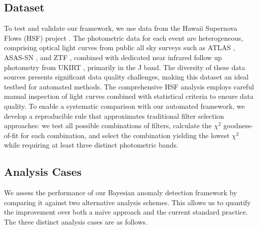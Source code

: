 \subsection{Dataset}

To test and validate our framework, we use data from the Hawaii Supernova Flows (HSF) project \citep{do2025hawaii}. The photometric data for each event are heterogeneous, comprising optical light curves from public all sky surveys such as ATLAS \citep{Tonry2018}, ASAS-SN \citep{Shappee2014}, and ZTF \citep{Bellm2019}, combined with dedicated near infrared follow up photometry from UKIRT \citep{Lawrence2007}, primarily in the J band. The diversity of these data sources presents significant data quality challenges, making this dataset an ideal testbed for automated methods. The comprehensive HSF analysis employs careful manual inspection of light curves combined with statistical criteria to ensure data quality. To enable a systematic comparison with our automated framework, we develop a reproducible rule that approximates traditional filter selection approaches: we test all possible combinations of filters, calculate the $\chi^2$ goodness-of-fit for each combination, and select the combination yielding the lowest $\chi^2$ while requiring at least three distinct photometric bands.

\subsection{Analysis Cases}
\label{subsec:analysis_cases}

We assess the performance of our Bayesian anomaly detection framework by comparing it against two alternative analysis schemes. This allows us to quantify the improvement over both a naive approach and the current standard practice. The three distinct analysis cases are as follows.

